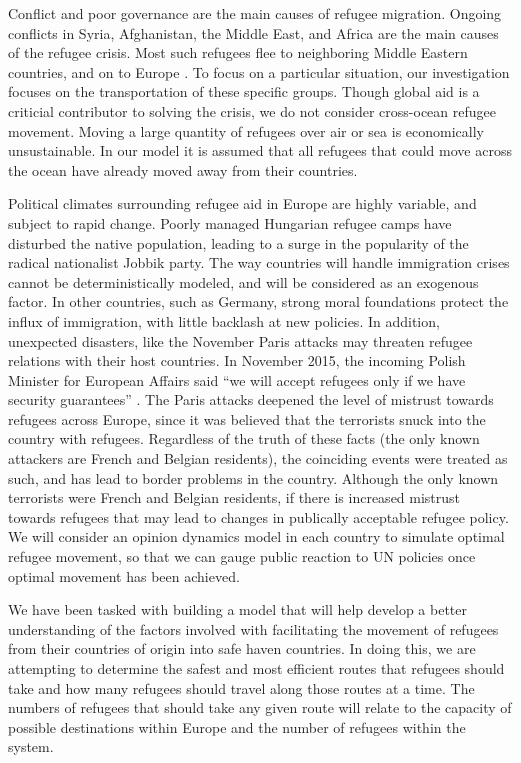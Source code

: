 \documentclass{article}
\begin{document}
Conflict and poor governance are the main causes of refugee migration\cite{simpson}. Ongoing conflicts in Syria, Afghanistan, the Middle East, and Africa are the main causes of the refugee crisis\cite{refugeefactsheet}. Most such refugees flee to neighboring Middle Eastern countries, and on to Europe \cite{refugeefactsheet}. To focus on a particular situation, our investigation focuses on the transportation of these specific groups. Though global aid is a criticial contributor to solving the crisis, we do not consider cross-ocean refugee movement. Moving a large quantity of refugees over air or sea is economically unsustainable. In our model it is assumed that all refugees that could move across the ocean have already moved away from their countries.

Political climates surrounding refugee aid in Europe are highly variable, and subject to rapid change. Poorly managed Hungarian refugee camps have disturbed the native population, leading to a surge in the popularity of the radical nationalist Jobbik party\cite{thorpe}. The way countries will handle immigration crises cannot be deterministically modeled, and will be considered as an exogenous factor. In other countries, such as Germany, strong moral foundations protect the influx of immigration, with little backlash at new policies\cite{hill}. In addition, unexpected disasters, like the November Paris attacks may threaten refugee relations with their host countries. In November 2015, the incoming Polish Minister for European Affairs said ``we will accept refugees only if we have security guarantees'' \cite{hewitt}. The Paris attacks deepened the level of mistrust towards refugees across Europe, since it was believed that the terrorists snuck into the country with refugees. Regardless of the truth of these facts (the only known attackers are French and Belgian residents), the coinciding events were treated as such, and has lead to border problems in the country. Although the only known terrorists were French and Belgian residents, if there is increased mistrust towards refugees that may lead to changes in publically acceptable refugee policy. We will consider an opinion dynamics model in each country to simulate optimal refugee movement, so that we can gauge public reaction to UN policies once optimal movement has been achieved.

We have been tasked with building a model that will help develop a better understanding of the factors involved with facilitating the movement of refugees from their countries of origin into safe haven countries. In doing this, we are attempting to determine the safest and most efficient routes that refugees should take and how many refugees should travel along those routes at a time. The numbers of refugees that should take any given route will relate to the capacity of possible destinations within Europe and the number of refugees within the system.
\end{document}
